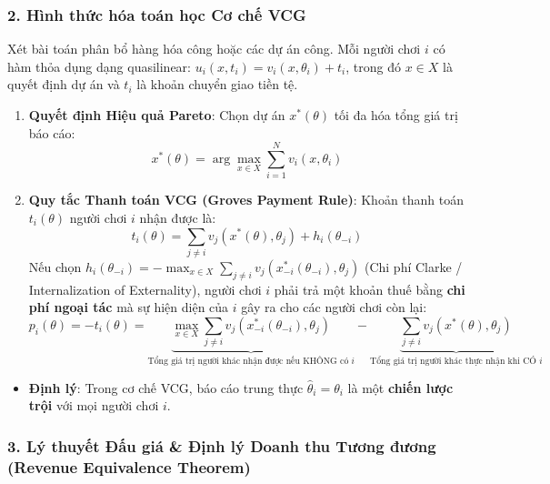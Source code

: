 \documentclass[
]{article}
\providecommand{\tightlist}{%
  \setlength{\itemsep}{0pt}\setlength{\parskip}{0pt}}
\begin{document}
\subsubsection{2. Hình thức hóa toán học Cơ chế
VCG}\label{huxecnh-thux1ee9c-huxf3a-touxe1n-hux1ecdc-cux1a1-chux1ebf-vcg}

Xét bài toán phân bổ hàng hóa công hoặc các dự án công. Mỗi người chơi
\(i\) có hàm thỏa dụng dạng quasilinear:
\(u_i(x, t_i) = v_i(x, \theta_i) + t_i\), trong đó \(x \in X\) là quyết
định dự án và \(t_i\) là khoản chuyển giao tiền tệ.

\begin{enumerate}
\def\labelenumi{\arabic{enumi}.}
\item
  \textbf{Quyết định Hiệu quả Pareto}: Chọn dự án \(x^*(\theta)\) tối đa
  hóa tổng giá trị báo cáo:
  \[ x^*(\theta) = \arg\max_{x \in X} \sum_{i=1}^{N} v_i(x, \theta_i) \]
\item
  \textbf{Quy tắc Thanh toán VCG (Groves Payment Rule)}: Khoản thanh
  toán \(t_i(\theta)\) người chơi \(i\) nhận được là:
  \[ t_i(\theta) = \sum_{j \neq i} v_j(x^*(\theta), \theta_j) + h_i(\theta_{-i}) \]
  Nếu chọn
  \(h_i(\theta_{-i}) = -\max_{x \in X} \sum_{j \neq i} v_j(x_{-i}^*(\theta_{-i}), \theta_j)\)
  (Chi phí Clarke / Internalization of Externality), người chơi \(i\)
  phải trả một khoản thuế bằng \textbf{chi phí ngoại tác} mà sự hiện
  diện của \(i\) gây ra cho các người chơi còn lại:
  \[ p_i(\theta) = -t_i(\theta) = \underbrace{\max_{x \in X} \sum_{j \neq i} v_j(x_{-i}^*(\theta_{-i}), \theta_j)}_{\text{Tổng giá trị người khác nhận được nếu KHÔNG có } i} - \underbrace{\sum_{j \neq i} v_j(x^*(\theta), \theta_j)}_{\text{Tổng giá trị người khác thực nhận khi CÓ } i} \]
\end{enumerate}

\begin{itemize}
\tightlist
\item
  \textbf{Định lý}: Trong cơ chế VCG, báo cáo trung thực
  \(\hat{\theta}_i = \theta_i\) là một \textbf{chiến lược trội} với mọi
  người chơi \(i\).
\end{itemize}

\subsubsection{3. Lý thuyết Đấu giá \& Định lý Doanh thu Tương đương
(Revenue Equivalence
Theorem)}\label{luxfd-thuyux1ebft-ux111ux1ea5u-giuxe1-ux111ux1ecbnh-luxfd-doanh-thu-tux1b0ux1a1ng-ux111ux1b0ux1a1ng-revenue-equivalence-theorem}
\end{document}
